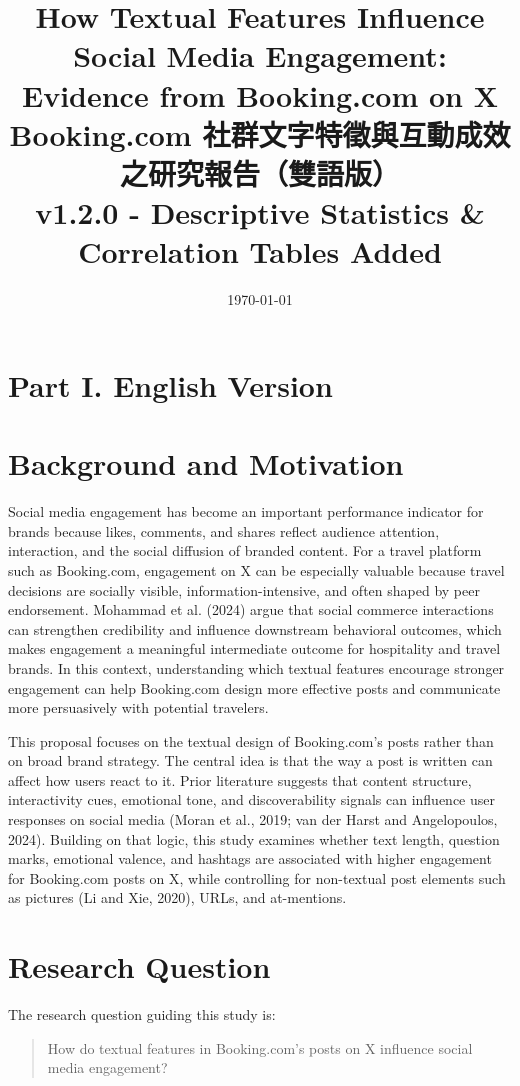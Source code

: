 \documentclass[12pt,a4paper,fontset=none]{ctexart}
\title{How Textual Features Influence Social Media Engagement:\\Evidence from Booking.com on X\\[0.5em]
\large Booking.com 社群文字特徵與互動成效之研究報告（雙語版）\\[0.5em]
\small v1.2.0 - Descriptive Statistics \& Correlation Tables Added}
\author{}
\date{\today}
\begin{document}
\maketitle
\tableofcontents
\newpage

\section*{Part I. English Version}

\section{Background and Motivation}
Social media engagement has become an important performance indicator for brands because likes, comments, and shares reflect audience attention, interaction, and the social diffusion of branded content. For a travel platform such as Booking.com, engagement on X can be especially valuable because travel decisions are socially visible, information-intensive, and often shaped by peer endorsement. Mohammad et al. (2024) argue that social commerce interactions can strengthen credibility and influence downstream behavioral outcomes, which makes engagement a meaningful intermediate outcome for hospitality and travel brands. In this context, understanding which textual features encourage stronger engagement can help Booking.com design more effective posts and communicate more persuasively with potential travelers.

This proposal focuses on the textual design of Booking.com's posts rather than on broad brand strategy. The central idea is that the way a post is written can affect how users react to it. Prior literature suggests that content structure, interactivity cues, emotional tone, and discoverability signals can influence user responses on social media (Moran et al., 2019; van der Harst and Angelopoulos, 2024). Building on that logic, this study examines whether text length, question marks, emotional valence, and hashtags are associated with higher engagement for Booking.com posts on X, while controlling for non-textual post elements such as pictures (Li and Xie, 2020), URLs, and at-mentions.

\section{Research Question}
The research question guiding this study is:

\begin{quote}
How do textual features in Booking.com's posts on X influence social media engagement?
\end{quote}
\end{document}
